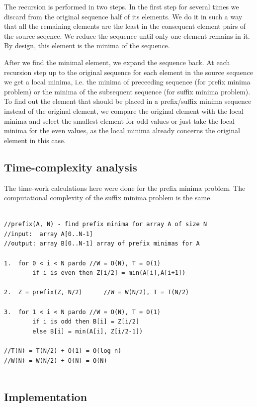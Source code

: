 \documentclass[a4paper,10pt,notitlepage]{article}
\begin{document}
The recursion is performed in two steps. In the first step for several times we discard from the original sequence half of its elements. We do it in such a way that all the remaining elements are the least in the consequent element pairs of the source seqence. We reduce the sequence until only one element remains in it. By design, this element is the minima of the sequence. 

After we find the minimal element, we expand the sequence back. At each recursion step up to the original sequence for each element in the source sequence we get a local minima, i.e. the minima of preceeding sequence (for prefix minima problem) or the minima of the subsequent sequence (for suffix minima problem). To find out the element that should be placed in a prefix/suffix minima sequence instead of the original element, we compare the original element with the local minima and select the smallest element for odd values or just take the local minima for the even values, as the local minima already concerns the original element in this case. 

\subsection{Time-complexity analysis}

The time-work calculations here were done for the prefix minima problem. The computational complexity of the suffix minima problem is the same.

\begin{lstlisting}

//prefix(A, N) - find prefix minima for array A of size N
//input:  array A[0..N-1]
//output: array B[0..N-1] array of prefix minimas for A

1.  for 0 < i < N pardo //W = O(N), T = O(1)
		if i is even then Z[i/2] = min(A[i],A[i+1])

2.  Z = prefix(Z, N/2)		//W = W(N/2), T = T(N/2)

3.  for 1 < i < N pardo //W = O(N), T = O(1)
		if i is odd then B[i] = Z[i/2]
		else B[i] = min(A[i], Z[i/2-1])

//T(N) = T(N/2) + O(1) = O(log n)
//W(N) = W(N/2) + O(N) = O(N)		
	
\end{lstlisting}

\subsection{Implementation}
\end{document}
